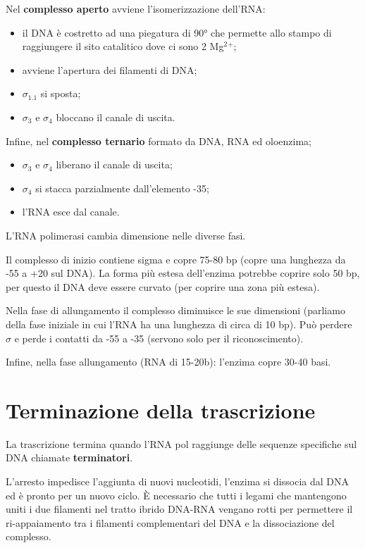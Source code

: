 \documentclass[11pt]{book}
\begin{document}
Nel \textbf{complesso aperto} avviene l'isomerizzazione dell'RNA:

\begin{itemize}
\itemsep1pt\parskip0pt
\item
  il DNA è costretto ad una piegatura di 90° che permette allo stampo di
  raggiungere il sito catalitico dove ci sono 2 Mg\(^2\)\(^+\);
\item
  avviene l'apertura dei filamenti di DNA;
\item
  \(\sigma\)\(_1.1\) si sposta;
\item
  \(\sigma\)\(_3\) e \(\sigma\)\(_4\) bloccano il canale di uscita.
\end{itemize}

Infine, nel \textbf{complesso ternario} formato da DNA, RNA ed
oloenzima;

\begin{itemize}
\itemsep1pt\parskip0pt
\item
  \(\sigma\)\(_3\) e \(\sigma\)\(_4\) liberano il canale di uscita;
\item
  \(\sigma\)\(_4\) si stacca parzialmente dall'elemento -35;
\item
  l'RNA esce dal canale.
\end{itemize}

L'RNA polimerasi cambia dimensione nelle diverse fasi.

Il complesso di inizio contiene sigma e copre 75-80 bp (copre una
lunghezza da -55 a +20 sul DNA). La forma più estesa dell'enzima
potrebbe coprire solo 50 bp, per questo il DNA deve essere curvato (per
coprire una zona più estesa).

Nella fase di allungamento il complesso diminuisce le sue dimensioni
(parliamo della fase iniziale in cui l'RNA ha una lunghezza di circa di
10 bp). Può perdere \(\sigma\) e perde i contatti da -55 a -35 (servono
solo per il riconoscimento).

Infine, nella fase allungamento (RNA di 15-20b): l'enzima copre 30-40
basi.

\section{Terminazione della
trascrizione}\label{terminazione-della-trascrizione}

La trascrizione termina quando l'RNA pol raggiunge delle sequenze
specifiche sul DNA chiamate \textbf{terminatori}.

L'arresto impedisce l'aggiunta di nuovi nucleotidi, l'enzima si dissocia
dal DNA ed è pronto per un nuovo ciclo. È necessario che tutti i legami
che mantengono uniti i due filamenti nel tratto ibrido DNA-RNA vengano
rotti per permettere il ri-appaiamento tra i filamenti complementari del
DNA e la dissociazione del complesso.
\end{document}
